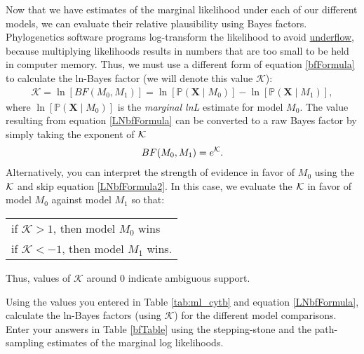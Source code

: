 Now that we have estimates of the marginal likelihood under each of our different models, we can evaluate their relative plausibility using Bayes factors.
Phylogenetics software programs log-transform the likelihood to avoid \href{http://en.wikipedia.org/wiki/Arithmetic_underflow}{underflow}, because multiplying likelihoods results in numbers that are too small to be held in computer memory.
Thus, we must use a different form of equation \ref{bfFormula} to calculate the ln-Bayes factor (we will denote this value $\mathcal{K}$):
\begin{align}\label{LNbfFormula}
\mathcal{K}=\ln[BF(M_0,M_1)] = \ln[\mathbb{P}(\mathbf X \mid M_0)]-\ln[\mathbb{P}(\mathbf X \mid M_1)],
\end{align}
where $\ln[\mathbb{P}(\mathbf X \mid M_0)]$ is the \textit{marginal lnL} estimate for model $M_0$. 
The value resulting from equation \ref{LNbfFormula} can be converted to a raw Bayes factor by simply taking the exponent of $\cal{K}$
\begin{align}\label{LNbfFormula2}
BF(M_0,M_1) = e^{\cal{K}}.
\end{align}
Alternatively, you can interpret the strength of evidence in favor of $M_0$ using the $\cal{K}$ and skip equation \ref{LNbfFormula2}. 
In this case, we evaluate the $\cal{K}$ in favor of model $M_0$ against model $M_1$ so that:
\begin{center}
\begin{tabular}{l}
if $\mathcal{K} > 1$, then model $M_0$ wins\\
if $\mathcal{K} < -1$, then model $M_1$ wins.
\end{tabular}
\end{center}
Thus, values of $\mathcal{K}$ around 0 indicate ambiguous support. 

Using the values you entered in Table \ref{tab:ml_cytb} and equation \ref{LNbfFormula},  calculate the ln-Bayes factors (using $\mathcal{K}$) for the different model comparisons. 
Enter your answers in Table \ref{bfTable} using the stepping-stone and the path-sampling estimates of the marginal log likelihoods. 

